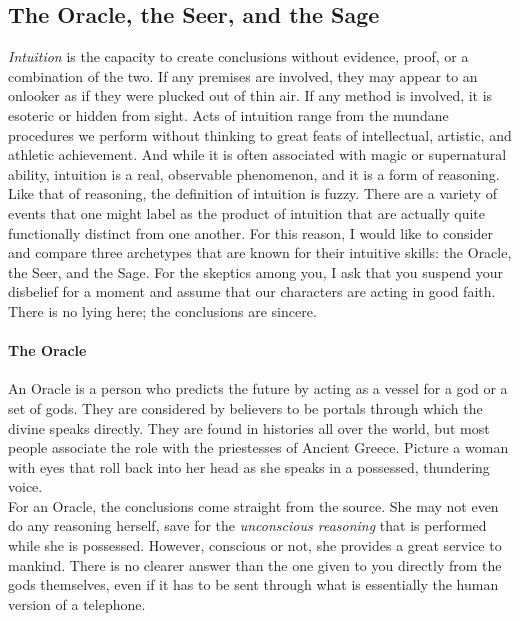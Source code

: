 
\subsection{The Oracle, the Seer, and the Sage}

\textit{Intuition} is the capacity to create conclusions without evidence, proof, or a combination of the two. If any premises are involved, they may appear to an onlooker as if they were plucked out of thin air. If any method is involved, it is esoteric or hidden from sight. Acts of intuition range from the mundane procedures we perform without thinking to great feats of intellectual, artistic, and athletic achievement. And while it is often associated with magic or supernatural ability, intuition is a real, observable phenomenon, and it is a form of reasoning. \\

Like that of reasoning, the definition of intuition is fuzzy. There are a variety of events that one might label as the product of intuition that are actually quite functionally distinct from one another. For this reason, I would like to consider and compare three archetypes that are known for their intuitive skills: the Oracle, the Seer, and the Sage. For the skeptics among you, I ask that you suspend your disbelief for a moment and assume that our characters are acting in good faith. There is no lying here; the conclusions are sincere. \\

\paragraph{The Oracle} \hspace*{1mm} \vspace*{2mm}

An Oracle is a person who predicts the future by acting as a vessel for a god or a set of gods. They are considered by believers to be portals through which the divine speaks directly. They are found in histories all over the world, but most people associate the role with the priestesses of Ancient Greece. Picture a woman with eyes that roll back into her head as she speaks in a possessed, thundering voice. \\

For an Oracle, the conclusions come straight from the source. She may not even do any reasoning herself, save for the \textit{unconscious reasoning} that is performed while she is possessed. However, conscious or not, she provides a great service to mankind. There is no clearer answer than the one given to you directly from the gods themselves, even if it has to be sent through what is essentially the human version of a telephone. \\

